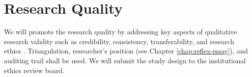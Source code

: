 \section{Research Quality}
\label{res-des-sec:quality}


\vspace{0.3cm}

We will promote the research quality by addressing key aspects of qualitative research validity such as credibility, consistency, transferability, and research ethics \cite[p.~239]{merriam:2016-ethics}. Triangulation, researcher’s position (see Chapter \ref{chap:reflex-essay}), and auditing trail shall be used. We will submit the study design to the institutional ethics review board.